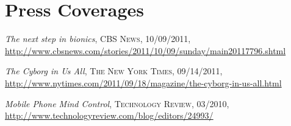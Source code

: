 \section{\sc Press Coverages}
\emph{The next step in bionics}, \textsc{CBS News}, 10/09/2011,
\url{http://www.cbsnews.com/stories/2011/10/09/sunday/main20117796.shtml}
\vspace*{-2.5mm}

\emph{The Cyborg in Us All}, \textsc{The New York Times}, 09/14/2011,
\url{http://www.nytimes.com/2011/09/18/magazine/the-cyborg-in-us-all.html}
\vspace*{-2.5mm}

\emph{Mobile Phone Mind Control}, \textsc{Technology Review}, 03/2010,
\url{http://www.technologyreview.com/blog/editors/24993/}
\vspace*{-2.5mm}

